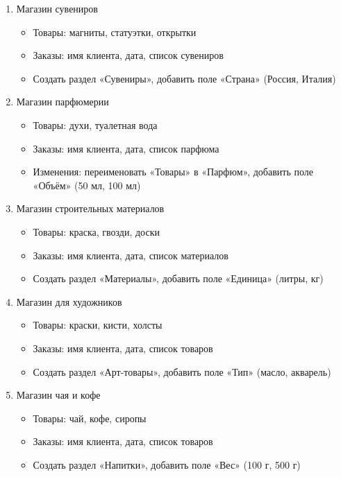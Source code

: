 \documentclass[12pt]{article}
\numberwithin{listing}{section}
\numberwithin{figure}{section}
\begin{document}
\begin{enumerate}
	\item Магазин сувениров
	      \begin{itemize}
		      \item Товары: магниты, статуэтки, открытки
		      \item Заказы: имя клиента, дата, список сувениров
		      \item Создать раздел «Сувениры», добавить поле «Страна» (Россия, Италия)
	      \end{itemize}

	      \newpage

	\item Магазин парфюмерии
	      \begin{itemize}
		      \item Товары: духи, туалетная вода
		      \item Заказы: имя клиента, дата, список парфюма
		      \item Изменения: переименовать «Товары» в «Парфюм», добавить поле «Объём» (50 мл, 100 мл)
	      \end{itemize}

	\item Магазин строительных материалов
	      \begin{itemize}
		      \item Товары: краска, гвозди, доски
		      \item Заказы: имя клиента, дата, список материалов
		      \item Создать раздел «Материалы», добавить поле «Единица» (литры, кг)
	      \end{itemize}

	\item Магазин для художников
	      \begin{itemize}
		      \item Товары: краски, кисти, холсты
		      \item Заказы: имя клиента, дата, список товаров
		      \item Создать раздел «Арт-товары», добавить поле «Тип» (масло, акварель)
	      \end{itemize}

	\item Магазин чая и кофе
	      \begin{itemize}
		      \item Товары: чай, кофе, сиропы
		      \item Заказы: имя клиента, дата, список товаров
		      \item Создать раздел «Напитки», добавить поле «Вес» (100 г, 500 г)
	      \end{itemize}


\end{enumerate}
\end{document}
